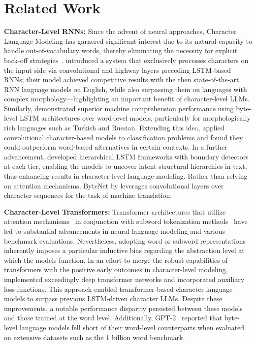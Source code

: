 \section{Related Work}
\label{section:related_work}

\textbf{Character-Level RNNs:} Since the advent of neural approaches, Character Language Modeling has garnered significant interest due to its natural capacity to handle out-of-vocabulary words, thereby eliminating the necessity for explicit back-off strategies~\citep{sutskever2011generating,mikolov2012subword,graves2013generating}. \cite{kim2016character} introduced a system that exclusively processes characters on the input side via convolutional and highway layers preceding LSTM-based RNNs; their model achieved competitive results with the then state-of-the-art RNN language models on English, while also surpassing them on languages with complex morphology—highlighting an important benefit of character-level LLMs. Similarly, \cite{kenter2018byte} demonstrated superior machine comprehension performance using byte-level LSTM architectures over word-level models, particularly for morphologically rich languages such as Turkish and Russian. Extending this idea, \cite{zhang2015character} applied convolutional character-based models to classification problems and found they could outperform word-based alternatives in certain contexts. In a further advancement, \citet{chung2019hierarchical} developed hierarchical LSTM frameworks with boundary detectors at each tier, enabling the models to uncover latent structural hierarchies in text, thus enhancing results in character-level language modeling. Rather than relying on attention mechanisms, ByteNet by \cite{kalchbrenner2016neural} leverages convolutional layers over character sequences for the task of machine translation.

\textbf{Character-Level Transformers:} Transformer architectures that utilize attention mechanisms~\citep{vaswani2017attention} in conjunction with subword tokenization methods~\citep{sennrich-etal-2016-neural} have led to substantial advancements in neural language modeling and various benchmark evaluations. Nevertheless, adopting word or subword representations inherently imposes a particular inductive bias regarding the abstraction level at which the models function. In an effort to merge the robust capabilities of transformers with the positive early outcomes in character-level modeling, \citet{al2019character} implemented exceedingly deep transformer networks and incorporated auxiliary loss functions. This approach enabled transformer-based character language models to surpass previous LSTM-driven character LLMs. Despite these improvements, a notable performance disparity persisted between these models and those trained at the word level. Additionally, GPT-2~\citep{radfordgpt2} reported that byte-level language models fell short of their word-level counterparts when evaluated on extensive datasets such as the 1 billion word benchmark.

